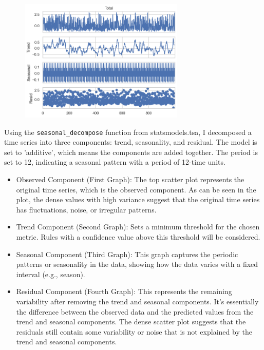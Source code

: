 \begin{figure}[h]
    \centering
    \includegraphics[width=0.7\textwidth]{Chapters/ch6/ch_6_decompose_graph.png}
\end{figure}

Using the \verb|seasonal_decompose| function from statsmodels.tsa, I decomposed a time series into three components: trend, seasonality, and residual. The model is set to 'additive', which means the components are added together. The period is set to 12, indicating a seasonal pattern with a period of 12-time units. 

\begin{itemize}
    \item Observed Component (First Graph): 
    \newline 
    The top scatter plot represents the original time series, which is the observed component. 
As can be seen in the plot, the dense values with high variance suggest that the original time series has fluctuations, noise, or irregular patterns.
    
    \item Trend Component (Second Graph):
    \newline 
    Sets a minimum threshold for the chosen metric. Rules with a confidence value above this threshold will be considered.

    \item Seasonal Component (Third Graph):
    \newline 
    This graph captures the periodic patterns or seasonality in the data, showing how the data varies with a fixed interval (e.g., season). 

    \item Residual Component (Fourth Graph):
    \newline
    This represents the remaining variability after removing the trend and seasonal components. It's essentially the difference between the observed data and the predicted values from the trend and seasonal components. The dense scatter plot suggests that the residuals still contain some variability or noise that is not explained by the trend and seasonal components.
    
\end{itemize}



